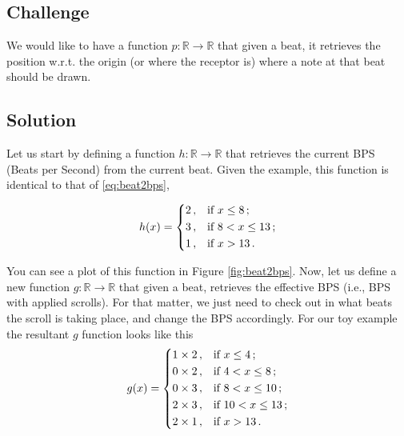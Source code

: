 \documentclass[a4paper,9pt]{article}
\begin{document}
    \subsection{Challenge}

    We would like to have a function $ p: \mathbb{R} \rightarrow \mathbb{R} $ that given a beat, it retrieves the position w.r.t. the origin (or where the receptor is) where a note at that beat should be drawn.

    \subsection{Solution}
    Let us start by defining a function $h: \mathbb{R} \rightarrow \mathbb{R}$ that retrieves the current BPS (Beats per Second) from the current beat. Given the example, this function is identical to that of \eqref{eq:beat2bps},

    \begin{equation}
	    h(x) = \begin{dcases}
		    2\,, & \text{if $x \leq 8\,;$}\\ 
		    3\,, & \text{if $8 < x \leq 13\,;$}\\ 
		    1\,, & \text{if $x > 13\,.$}\\ 
	    \end{dcases}
	    \label{eq:beat2bps-as-h}
    \end{equation}

    You can see a plot of this function in Figure  \ref{fig:beat2bps}. Now, let us define a new function $g: \mathbb{R}\rightarrow \mathbb{R}$ that given a beat, retrieves the effective BPS (i.e., BPS with applied scrolls). For that matter, we just need to check out in what beats the scroll is taking place, and change the BPS accordingly. For our toy example the resultant $g$ function looks like this
    \begin{equation}
	    g(x) = \begin{dcases}
		    1\times 2\,, & \text{if $x \leq 4\,;$}\\ 
		    0\times 2\,, & \text{if $4 < x \leq 8\,;$}\\ 
		    0\times 3\,, & \text{if $8 < x \leq 10\,;$}\\ 
		    2\times 3\,, & \text{if $10 < x \leq 13\,;$}\\ 
		    2\times 1 \,, & \text{if $x > 13\,.$}\\ 
	    \end{dcases}
	    \label{eq:beat2effective-bps}
    \end{equation}
\end{document}
